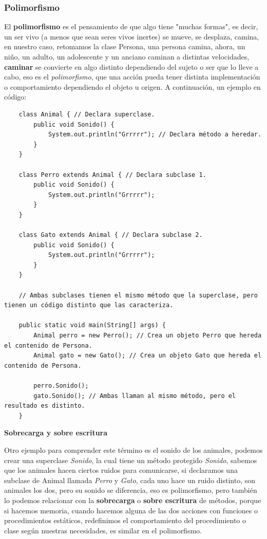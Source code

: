 \subsubsection{Polimorfismo}
\hspace{0.55cm}El \textbf{polimorfismo} es el pensamiento de que algo tiene "muchas formas", es decir, un ser vivo (a menos que sean seres vivos inertes) se mueve, se desplaza, camina, en nuestro caso, retomamos la clase Persona, una persona camina, ahora, un niño, un adulto, un adolescente y un anciano caminan a distintas velocidades, \textbf{caminar} se convierte en algo distinto dependiendo del sujeto o ser que lo lleve a cabo, eso es el \textit{polimorfismo}, que una acción pueda tener distinta implementación o comportamiento dependiendo el objeto u origen. A continuación, un ejemplo en código:
\begin{lstlisting}
    class Animal { // Declara superclase.
        public void Sonido() {
            System.out.println("Grrrrr"); // Declara método a heredar.
        }
    }
    
    class Perro extends Animal { // Declara subclase 1.
        public void Sonido() {
            System.out.println("Grrrrr");
        }
    }
    
    class Gato extends Animal { // Declara subclase 2.
        public void Sonido() {
            System.out.println("Grrrrr");
        }
    }
    
    // Ambas subclases tienen el mismo método que la superclase, pero tienen un código distinto que las caracteriza.
    
    public static void main(String[] args) {
        Animal perro = new Perro(); // Crea un objeto Perro que hereda el contenido de Persona.
        Animal gato = new Gato(); // Crea un objeto Gato que hereda el contenido de Persona.
        
        perro.Sonido();
        gato.Sonido(); // Ambas llaman al mismo método, pero el resultado es distinto.
    }
\end{lstlisting}

\textbf{Sobrecarga y sobre escritura}

Otro ejemplo para comprender este término es el sonido de los animales, podemos crear una superclase \textit{Sonido}, la cual tiene un método protegido \textit{Sonido}, sabemos que los animales hacen ciertos ruidos para comunicarse, si declaramos una subclase de Animal llamada \textit{Perro} y \textit{Gato}, cada uno hace un ruido distinto, son animales los dos, pero su sonido se diferencia, eso es polimorfismo, pero también lo podemos relacionar con la \textbf{sobrecarga} o \textbf{sobre escritura} de métodos, porque si hacemos memoria, cuando hacemos alguna de las dos acciones con funciones o procedimientos estáticos, redefinimos el comportamiento del procedimiento o clase según nuestras necesidades, es similar en el polimorfismo.

